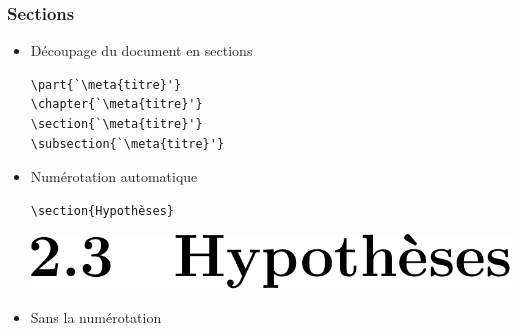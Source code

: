 \begin{frame}[fragile=singleslide]
  \frametitle{Sections}
  \begin{itemize}
  \item Découpage du document en sections
\begin{lstlisting}
\part{`\meta{titre}'}
\chapter{`\meta{titre}'}
\section{`\meta{titre}'}
\subsection{`\meta{titre}'}
\end{lstlisting}
  \item Numérotation automatique
    \begin{demo}
      \begin{minipage}{0.45\linewidth}
\begin{lstlisting}
\section{Hypothèses}
\end{lstlisting}
      \end{minipage}
      \hfill
      \begin{minipage}{0.45\linewidth}
        \includegraphics[height=0.8\baselineskip,keepaspectratio]{images/section-num}
      \end{minipage}
    \end{demo}
  \item Sans la numérotation
    \begin{demo}
      \begin{minipage}{0.45\linewidth}
\begin{lstlisting}

\end{lstlisting}
\end{minipage}
\end{demo}
\end{itemize}
\end{frame}
